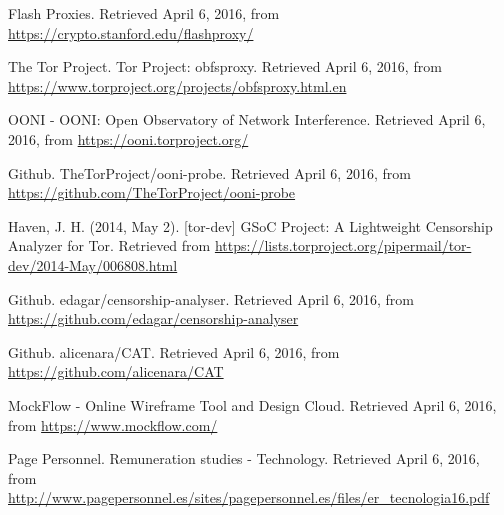 \documentclass[a4paper,10pt]{article}
\begin{document}
\begin{thebibliography}{99}
Flash Proxies. 
Retrieved April 6, 2016, from \url{https://crypto.stanford.edu/flashproxy/}

The Tor Project. 
Tor Project: obfsproxy. 
Retrieved April 6, 2016, from \url{https://www.torproject.org/projects/obfsproxy.html.en}

OONI - OONI: Open Observatory of Network Interference. 
Retrieved April 6, 2016, from \url{https://ooni.torproject.org/}
 
Github.
TheTorProject/ooni-probe. 
Retrieved April 6, 2016, from \url{https://github.com/TheTorProject/ooni-probe}

Haven, J. H. (2014, May 2). [tor-dev] GSoC Project: A Lightweight Censorship Analyzer for Tor. 
Retrieved from \url{https://lists.torproject.org/pipermail/tor-dev/2014-May/006808.html}

Github.
edagar/censorship-analyser. 
Retrieved April 6, 2016, from \url{https://github.com/edagar/censorship-analyser}

Github.
alicenara/CAT. 
Retrieved April 6, 2016, from \url{https://github.com/alicenara/CAT}

MockFlow - Online Wireframe Tool and Design Cloud. 
Retrieved April 6, 2016, from \url{https://www.mockflow.com/}

Page Personnel. 
Remuneration studies - Technology. 
Retrieved April 6, 2016, from \url{http://www.pagepersonnel.es/sites/pagepersonnel.es/files/er_tecnologia16.pdf}

\end{thebibliography}
\end{document}

